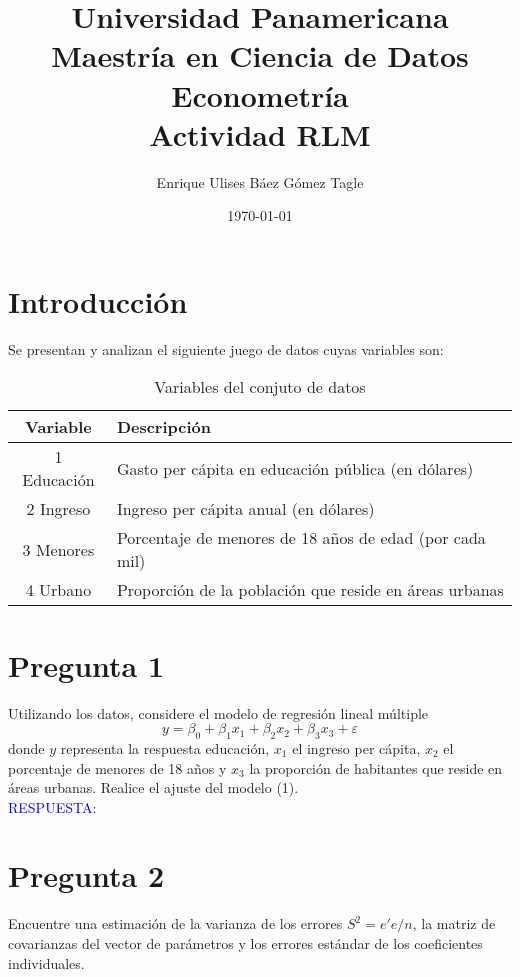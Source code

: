 \documentclass[10pt]{article}
\title{Universidad Panamericana \\ Maestría en Ciencia de Datos \\ Econometría \\ \vspace{0.5cm} Actividad RLM}
\author{Enrique Ulises Báez Gómez Tagle}
\date{\today}
\begin{document}
\maketitle
\tableofcontents
\newpage
\section{Introducción}
Se presentan y analizan el siguiente juego de datos cuyas variables son:
\begin{table}[H]
\centering
\begin{tabular}{|c|l|}
\hline
\textbf{Variable} & \textbf{Descripción} \\
\hline
1 Educación & Gasto per cápita en educación pública (en dólares) \\
\hline
2 Ingreso & Ingreso per cápita anual (en dólares) \\
\hline
3 Menores & Porcentaje de menores de 18 años de edad (por cada mil) \\
\hline
4 Urbano & Proporción de la población que reside en áreas urbanas \\
\hline
\end{tabular}
\caption{Variables del conjuto de datos}
\end{table}
\section{Pregunta 1}
Utilizando los datos, considere el modelo de regresión lineal múltiple 
\[
y = \beta_0 + \beta_1 x_1 + \beta_2 x_2 + \beta_3 x_3 + \varepsilon
\]
donde $y$ representa la respuesta educación, $x_1$ el ingreso per cápita, $x_2$ el porcentaje de menores de 18 años y $x_3$ la proporción de habitantes que reside en áreas urbanas. Realice el ajuste del modelo (1). \\

\textcolor{blue}{RESPUESTA: }
\section{Pregunta 2}
Encuentre una estimación de la varianza de los errores $S^2 = e'e/n$, la matriz de covarianzas del vector de parámetros y los errores estándar de los coeficientes individuales. \\
\end{document}

